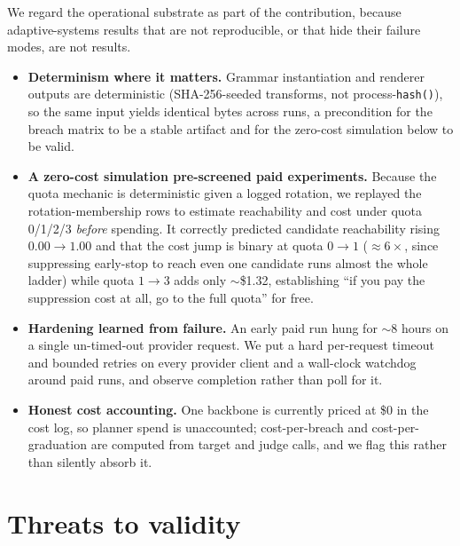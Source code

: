 \documentclass[letterpaper,twocolumn,10pt]{article}
\begin{document}
We regard the operational substrate as part of the contribution, because adaptive-systems results that are not reproducible, or that hide their failure modes, are not results.

\begin{itemize}
\item \textbf{Determinism where it matters.} Grammar instantiation and renderer outputs are deterministic (SHA-256-seeded transforms, not process-\texttt{hash()}), so the same input yields identical bytes across runs, a precondition for the breach matrix to be a stable artifact and for the zero-cost simulation below to be valid.
\item \textbf{A zero-cost simulation pre-screened paid experiments.} Because the quota mechanic is deterministic given a logged rotation, we replayed the rotation-membership rows to estimate reachability and cost under quota 0/1/2/3 \emph{before} spending. It correctly predicted candidate reachability rising $0.00\to1.00$ and that the cost jump is binary at quota $0\to1$ ($\approx6\times$, since suppressing early-stop to reach even one candidate runs almost the whole ladder) while quota $1\to3$ adds only $\sim$\$1.32, establishing ``if you pay the suppression cost at all, go to the full quota'' for free.
\item \textbf{Hardening learned from failure.} An early paid run hung for $\sim$8 hours on a single un-timed-out provider request. We put a hard per-request timeout and bounded retries on every provider client and a wall-clock watchdog around paid runs, and observe completion rather than poll for it.
\item \textbf{Honest cost accounting.} One backbone is currently priced at \$0 in the cost log, so planner spend is unaccounted; cost-per-breach and cost-per-graduation are computed from target and judge calls, and we flag this rather than silently absorb it.
\end{itemize}

\section{Threats to validity}
\end{document}
